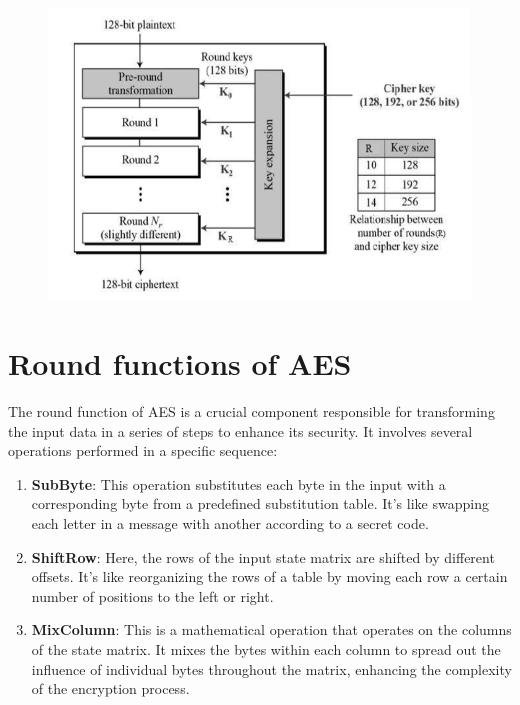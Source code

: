 \documentclass[11pt]{article}
\begin{document}
\begin{figure}[htbp]
  \centering
  \includegraphics[width=1.00\textwidth]{image4.1.PNG} %
\end{figure}

\section*{Round functions of AES}
The round function of AES is a crucial component responsible for transforming the input data in a series of steps to enhance its security. It involves several operations performed in a specific sequence:

\begin{enumerate}
    \item \textbf{SubByte}: This operation substitutes each byte in the input with a corresponding byte from a predefined substitution table. It's like swapping each letter in a message with another according to a secret code.
    
    \item \textbf{ShiftRow}: Here, the rows of the input state matrix are shifted by different offsets. It's like reorganizing the rows of a table by moving each row a certain number of positions to the left or right.
    
    \item \textbf{MixColumn}: This is a mathematical operation that operates on the columns of the state matrix. It mixes the bytes within each column to spread out the influence of individual bytes throughout the matrix, enhancing the complexity of the encryption process.
\end{enumerate}
\end{document}
